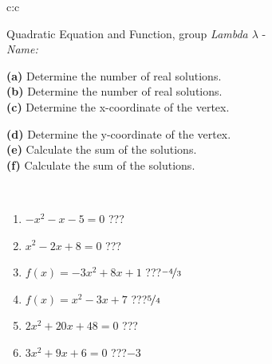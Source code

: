 \documentclass[10pt]{report}
\begin{document}
\begin{tabular}{c:c}
\begin{minipage}[c][104.5mm][t]{0.5\linewidth}
\begin{center}
\vspace{7mm}
{\huge {\LARGE Quadratic Equation and Function}, group \textit{Lambda $\lambda$} -}\\[5mm]
\textit{Name:}\phantom{xxxxxxxxxxxxxxxxxxxxxxxxxxxxxxxxxxxxxxxxxxxxxxxxxxxxxxxxxxxxxxxxx}\\[5mm]
\begin{minipage}{0.95\linewidth}
\begin{center}
{\small \begin{minipage}{0.5\textwidth}
\textbf{(a)} Determine the number of real solutions. \\[1mm]
\textbf{(b)} Determine the number of real solutions. \\[1mm]
\textbf{(c)} Determine the x-coordinate of the vertex.
\end{minipage} \begin{minipage}{0.49\textwidth}
\textbf{(d)} Determine the y-coordinate of the vertex. \\[1mm]
\textbf{(e)} Calculate the sum of the solutions. \\[1mm]
\textbf{(f)} Calculate the sum of the solutions.
\end{minipage}
}
\end{center}
\end{minipage}
\\[4mm]
\begin{minipage}{0.79\linewidth}
\begin{center}
\begin{varwidth}{\linewidth}
\begin{enumerate}
\Large
\item $-x^2-x-5=0$\quad \dotfill\; ???\;\dotfill {}
\item $x^2-2x+8=0$\quad \dotfill\; ???\;\dotfill {}
\item $f(x)=-3x^2+8x+1$\quad \dotfill\; ???\;\dotfill \quad $\nicefrac{-4}{3}$
\item $f(x)=x^2-3x+7$\quad \dotfill\; ???\;\dotfill \quad $\nicefrac{5}{4}$
\item $2x^2+20x+48=0$\quad \dotfill\; ???\;\dotfill {}
\item $3x^2+9x+6=0$\quad \dotfill\; ???\;\dotfill \quad $-3$
\end{enumerate}
\end{varwidth}
\end{center}

\end{minipage}
\end{center}
\end{minipage}
\end{tabular}
\end{document}
